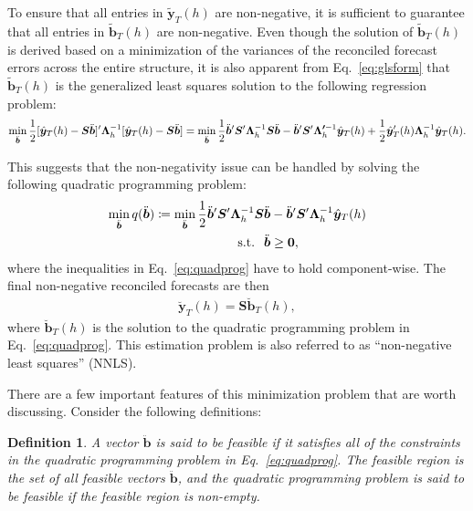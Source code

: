 \documentclass[11pt]{article}
\newcommand{\0}{\phantom{0}}
\newtheorem{definition}{Definition}[section]
\begin{document}
To ensure that all entries in $\tilde{\bm{y}}_{T}(h)$ are non-negative, it is sufficient to guarantee that all entries in $\tilde{\bm{b}}_{T}(h)$ are non-negative. Even though the solution of $\tilde{\bm{b}}_{T}(h)$ is derived based on a minimization of the variances of the reconciled forecast errors across the entire structure, it is also apparent from Eq.~\eqref{eq:glsform} that $\tilde{\bm{b}}_{T}(h)$ is the generalized least squares solution to the following regression problem:
\begin{align*}
\operatornamewithlimits{min}_{\ddot{\bm{b}}} \frac{1}{2}[\hat{\bm{y}}_{T}(h) - \bm{S}\ddot{\bm{b}}]'\bm{\Lambda}^{-1}_{h}[\hat{\bm{y}}_{T}(h) - \bm{S}\ddot{\bm{b}}] =  \operatornamewithlimits{min}_{\ddot{\bm{b}}} \frac{1}{2}\ddot{\bm{b}}'\bm{S}'\bm{\Lambda}^{-1}_{h}\bm{S}\ddot{\bm{b}} - \ddot{\bm{b}}'\bm{S}'\bm{\Lambda'}^{-1}_{h}\hat{\bm{y}}_{T}(h) +  \frac{1}{2}\hat{\bm{y}}_{T}'(h) \bm{\Lambda}_{h}^{-1}\hat{\bm{y}}_{T}(h).
\end{align*}

This suggests that the non-negativity issue can be handled by solving the following quadratic programming problem:
\begin{align}
\label{eq:quadprog}
\operatornamewithlimits{min}_{\ddot{\bm{b}}} q(\ddot{\bm{b}}) \coloneqq \operatornamewithlimits{min}_{\ddot{\bm{b}}} \frac{1}{2}\ddot{\bm{b}}'\bm{S}'\bm{\Lambda}^{-1}_{h}\bm{S}\ddot{\bm{b}} & - \ddot{\bm{b}}'\bm{S}'\bm{\Lambda}^{-1}_{h}\hat{\bm{y}}_{T}(h) \nonumber\\
\text{s.t.} \hspace*{2.5mm} \ddot{\bm{b}} & \geq \bm{0},
\end{align}
where the inequalities in Eq.~\eqref{eq:quadprog} have to hold component-wise. The final non-negative reconciled forecasts are then
\begin{align*}
\breve{\bm{y}}_{T}(h) = \bm{S}\breve{\bm{b}}_{T}(h),
\end{align*}
where $\breve{\bm{b}}_{T}(h)$ is the solution to the quadratic programming problem in Eq.~\eqref{eq:quadprog}. This estimation problem is also referred to as ``non-negative least squares'' (NNLS).

There are a few important features of this minimization problem that are worth discussing. Consider the following definitions:

\begin{definition}
	A vector $\ddot{\bm{b}}$ is said to be feasible if it satisfies all of the constraints in the quadratic programming problem in Eq.~\eqref{eq:quadprog}. The feasible region is the set of all feasible vectors $\ddot{\bm{b}}$, and the quadratic programming problem is said to be feasible if the feasible region is non-empty.
\end{definition}
\end{document}
